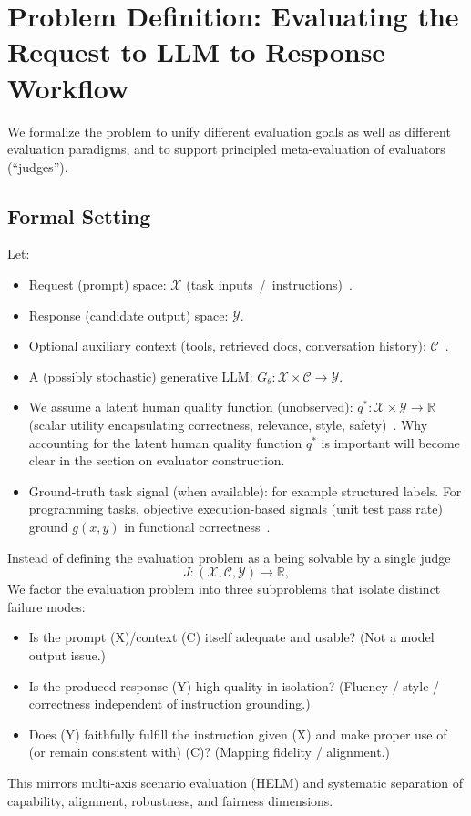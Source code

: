 \section{Problem Definition: Evaluating the Request to LLM to Response Workflow}

We formalize the problem to unify different evaluation goals as well as different evaluation paradigms, and to support principled meta-evaluation of evaluators (``judges'').

\subsection{Formal Setting}
Let:
\begin{itemize}
	\item Request (prompt) space: $\mathcal{X}$ (task inputs~/~instructions)~\cite{srivastava2022bigbench, liang2022helm}.
	\item Response (candidate output) space: $\mathcal{Y}$.
	\item Optional auxiliary context (tools, retrieved docs, conversation history): $\mathcal{C}$~\cite{liang2022helm}.
	\item A (possibly stochastic) generative LLM\@: $G_{\theta}: \mathcal{X} \times \mathcal{C} \to \mathcal{Y}$.
	\item We assume a latent human quality function (unobserved): $q^{*}: \mathcal{X} \times \mathcal{Y} \to \mathbb{R}$ (scalar utility encapsulating correctness, relevance, style, safety)~\cite{stiennon2020learning, ouyang2022training}. Why accounting for the latent human quality function $q^{*}$ is important will become clear in the section on evaluator construction.
	\item Ground-truth task signal (when available): for example structured labels. For programming tasks, objective execution-based signals (unit test pass rate) ground $g(x,y)$ in functional correctness~\cite{chen2021evaluating}.
\end{itemize}

Instead of defining the evaluation problem as a being solvable by a single judge
\begin{equation}
	J: (\mathcal{X},\mathcal{C},\mathcal{Y}) \to \mathbb{R},
\end{equation}  
We factor the evaluation problem into three subproblems that isolate distinct failure modes:

\begin{itemize}
    \item Is the prompt (X)/context (C) itself adequate and usable? (Not a model output issue.)
    \item Is the produced response (Y) high quality in isolation? (Fluency / style / correctness independent of instruction grounding.)
    \item Does (Y) faithfully fulfill the instruction given (X) and make proper use of (or remain consistent with) (C)? (Mapping fidelity / alignment.)
\end{itemize}
This mirrors multi-axis scenario evaluation (HELM) and systematic separation of capability, alignment, robustness, and fairness dimensions. %

